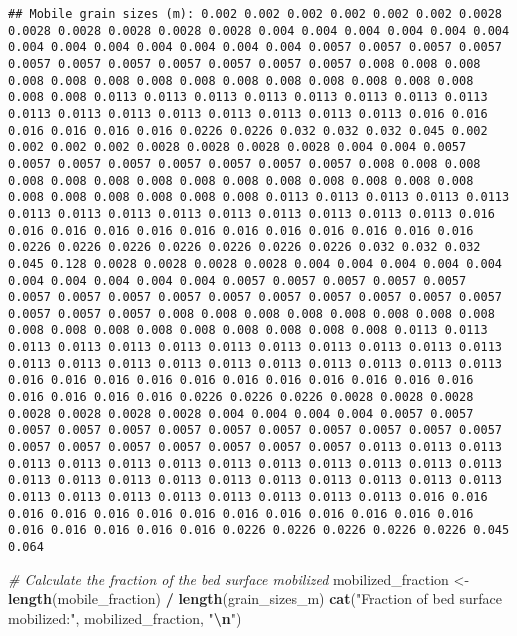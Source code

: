 \documentclass[
]{article}
\newenvironment{Shaded}{\begin{snugshade}}{\end{snugshade}}
\newcommand{\CommentTok}[1]{\textcolor[rgb]{0.56,0.35,0.01}{\textit{#1}}}
\newcommand{\FunctionTok}[1]{\textcolor[rgb]{0.13,0.29,0.53}{\textbf{#1}}}
\newcommand{\NormalTok}[1]{#1}
\newcommand{\OtherTok}[1]{\textcolor[rgb]{0.56,0.35,0.01}{#1}}
\newcommand{\SpecialCharTok}[1]{\textcolor[rgb]{0.81,0.36,0.00}{\textbf{#1}}}
\newcommand{\StringTok}[1]{\textcolor[rgb]{0.31,0.60,0.02}{#1}}
\begin{document}
\begin{verbatim}
## Mobile grain sizes (m): 0.002 0.002 0.002 0.002 0.002 0.002 0.0028 0.0028 0.0028 0.0028 0.0028 0.0028 0.004 0.004 0.004 0.004 0.004 0.004 0.004 0.004 0.004 0.004 0.004 0.004 0.004 0.0057 0.0057 0.0057 0.0057 0.0057 0.0057 0.0057 0.0057 0.0057 0.0057 0.0057 0.008 0.008 0.008 0.008 0.008 0.008 0.008 0.008 0.008 0.008 0.008 0.008 0.008 0.008 0.008 0.008 0.0113 0.0113 0.0113 0.0113 0.0113 0.0113 0.0113 0.0113 0.0113 0.0113 0.0113 0.0113 0.0113 0.0113 0.0113 0.0113 0.016 0.016 0.016 0.016 0.016 0.016 0.0226 0.0226 0.032 0.032 0.032 0.045 0.002 0.002 0.002 0.002 0.0028 0.0028 0.0028 0.0028 0.004 0.004 0.0057 0.0057 0.0057 0.0057 0.0057 0.0057 0.0057 0.0057 0.008 0.008 0.008 0.008 0.008 0.008 0.008 0.008 0.008 0.008 0.008 0.008 0.008 0.008 0.008 0.008 0.008 0.008 0.008 0.008 0.0113 0.0113 0.0113 0.0113 0.0113 0.0113 0.0113 0.0113 0.0113 0.0113 0.0113 0.0113 0.0113 0.0113 0.016 0.016 0.016 0.016 0.016 0.016 0.016 0.016 0.016 0.016 0.016 0.016 0.0226 0.0226 0.0226 0.0226 0.0226 0.0226 0.0226 0.032 0.032 0.032 0.045 0.128 0.0028 0.0028 0.0028 0.0028 0.004 0.004 0.004 0.004 0.004 0.004 0.004 0.004 0.004 0.004 0.0057 0.0057 0.0057 0.0057 0.0057 0.0057 0.0057 0.0057 0.0057 0.0057 0.0057 0.0057 0.0057 0.0057 0.0057 0.0057 0.0057 0.0057 0.008 0.008 0.008 0.008 0.008 0.008 0.008 0.008 0.008 0.008 0.008 0.008 0.008 0.008 0.008 0.008 0.008 0.0113 0.0113 0.0113 0.0113 0.0113 0.0113 0.0113 0.0113 0.0113 0.0113 0.0113 0.0113 0.0113 0.0113 0.0113 0.0113 0.0113 0.0113 0.0113 0.0113 0.0113 0.0113 0.016 0.016 0.016 0.016 0.016 0.016 0.016 0.016 0.016 0.016 0.016 0.016 0.016 0.016 0.016 0.0226 0.0226 0.0226 0.0028 0.0028 0.0028 0.0028 0.0028 0.0028 0.0028 0.004 0.004 0.004 0.004 0.0057 0.0057 0.0057 0.0057 0.0057 0.0057 0.0057 0.0057 0.0057 0.0057 0.0057 0.0057 0.0057 0.0057 0.0057 0.0057 0.0057 0.0057 0.0057 0.0113 0.0113 0.0113 0.0113 0.0113 0.0113 0.0113 0.0113 0.0113 0.0113 0.0113 0.0113 0.0113 0.0113 0.0113 0.0113 0.0113 0.0113 0.0113 0.0113 0.0113 0.0113 0.0113 0.0113 0.0113 0.0113 0.0113 0.0113 0.0113 0.0113 0.0113 0.016 0.016 0.016 0.016 0.016 0.016 0.016 0.016 0.016 0.016 0.016 0.016 0.016 0.016 0.016 0.016 0.016 0.016 0.0226 0.0226 0.0226 0.0226 0.0226 0.045 0.064
\end{verbatim}

\begin{Shaded}
\begin{Highlighting}[]
\CommentTok{\# Calculate the fraction of the bed surface mobilized}
\NormalTok{mobilized\_fraction }\OtherTok{\textless{}{-}} \FunctionTok{length}\NormalTok{(mobile\_fraction) }\SpecialCharTok{/} \FunctionTok{length}\NormalTok{(grain\_sizes\_m)}
\FunctionTok{cat}\NormalTok{(}\StringTok{"Fraction of bed surface mobilized:"}\NormalTok{, mobilized\_fraction, }\StringTok{"}\SpecialCharTok{\textbackslash{}n}\StringTok{"}\NormalTok{)}
\end{Highlighting}
\end{Shaded}
\end{document}
